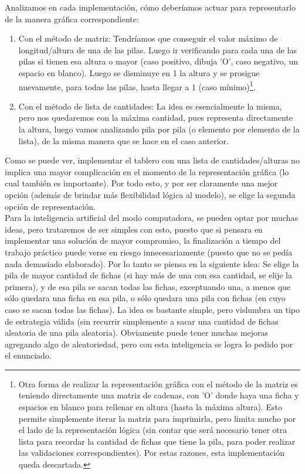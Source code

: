 \documentclass[a4paper,12pt]{article}
\begin{document}
Analizamos en cada implementación, cómo deberíamos actuar para representarlo de la manera gráfica correspondiente:
\begin{enumerate}
	\item Con el método de matriz: Tendríamos que conseguir el valor máximo de longitud/altura de una de
	 las pilas. Luego ir verificando para cada una de las pilas si tienen esa altura o mayor (caso
	 positivo, dibuja 'O', caso negativo, un espacio en blanco). Luego se disminuye en 1 la altura y se
	 prosigue nuevamente, para todas las pilas, hasta llegar a 1 (caso mínimo)\footnote{Otra forma de
	 realizar la representación gráfica con el método de la matriz es teniendo directamente una matriz
	 de cadenas, con 'O' donde haya una ficha y espacios en blanco para rellenar en altura (hasta la
	 máxima altura). Esto permite simplemente iterar la matriz para imprimirla, pero limita mucho por el
	 lado de la representación lógica (sin contar que será necesario tener otra lista para recordar la
	 cantidad de fichas que tiene la pila, para poder realizar las validaciones correspondientes). Por
	 estas razones, esta implementación queda descartada.}.
	 
	\item Con el método de lista de cantidades: La idea es esencialmente la misma, pero nos quedaremos
	con la máxima cantidad, pues representa directamente la altura, luego vamos analizando pila por pila
	(o elemento por elemento de la lista), de la misma manera que se hace en el caso anterior.
\end{enumerate}

Como se puede ver, implementar el tablero con una lista de cantidades/alturas no implica una mayor complicación en el momento de la representación gráfica (lo cual también es importante). Por todo esto, y por ser claramente una mejor opción (además de brindar más flexibilidad lógica al modelo), se elige la segunda opción de representación.\\

Para la inteligencia artificial del modo computadora, se pueden optar por muchas ideas, pero trataremos de ser simples con esto, puesto que si pensara en implementar una solución de mayor compromiso, la finalización a tiempo del trabajo práctico puede verse en riesgo innecesariamente (puesto que no se pedía nada demasiado elaborado). Por lo tanto se piensa en la siguiente idea: Se elige la pila de mayor cantidad de fichas (si hay más de una con esa cantidad, se elije la primera), y de esa pila se sacan todas las fichas, exceptuando una, a menos que sólo quedara una ficha en esa pila, o sólo quedara una pila con fichas (en cuyo caso se sacan todas las fichas). La idea es bastante simple, pero vislumbra un 
tipo de estrategia válida (sin recurrir simplemente a sacar una cantidad de fichas aleatoria de una pila
 aleatoria). Obviamente puede tener muchas mejoras agregando algo de aleatoriedad, pero con esta
  inteligencia se logra lo pedido por el enunciado.
\end{document}
